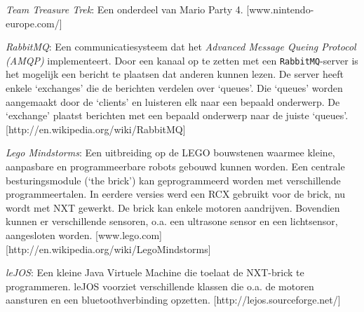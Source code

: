 \documentclass[eind]{penoverslag}
\begin{document}
\begin{thebibliography}{9}

\textit{Team Treasure Trek}: Een onderdeel van Mario Party 4. \mbox{[www.nintendo-europe.com/]}

\textit{RabbitMQ}: Een communicatiesysteem dat het \textit{Advanced Message Queing Protocol (AMQP)} implementeert. Door een kanaal op te zetten met een \texttt{RabbitMQ}-server is het mogelijk een bericht te plaatsen dat anderen kunnen lezen. De server heeft enkele `exchanges' die de berichten verdelen over `queues'. Die `queues' worden aangemaakt door de `clients' en luisteren elk naar een bepaald onderwerp. De `exchange' plaatst berichten met een bepaald onderwerp naar de juiste `queues'.
\mbox{[http://en.wikipedia.org/wiki/RabbitMQ]}

\textit{Lego Mindstorms}:  Een uitbreiding op de LEGO bouwstenen waarmee kleine, aanpasbare en programmeerbare robots gebouwd kunnen worden. Een centrale besturingsmodule (`the brick') kan geprogrammeerd worden met verschillende programmeertalen. In eerdere versies werd een RCX gebruikt voor de brick, nu wordt met NXT gewerkt. De brick kan enkele motoren aandrijven. Bovendien kunnen er verschillende sensoren, o.a. een ultrasone sensor en een lichtsensor, aangesloten worden.  \mbox{[www.lego.com]} \mbox{[http://en.wikipedia.org/wiki/Lego\textendash Mindstorms]}

\textit{leJOS}: Een kleine Java Virtuele Machine die toelaat de NXT-brick te programmeren. leJOS voorziet verschillende klassen die o.a. de motoren aansturen en een bluetoothverbinding opzetten.  \mbox{[http://lejos.sourceforge.net/]}

\end{thebibliography}
\end{document}
